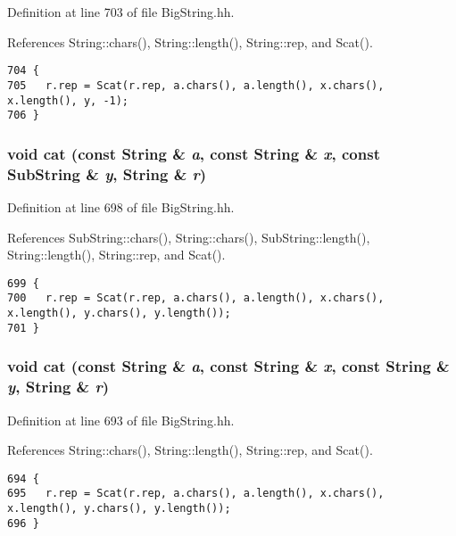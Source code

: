 Definition at line 703 of file Big\-String.hh.

References String::chars(), String::length(), String::rep, and Scat().



\footnotesize\begin{verbatim}704 {
705   r.rep = Scat(r.rep, a.chars(), a.length(), x.chars(), x.length(), y, -1);
706 }
\end{verbatim}\normalsize 
{}
\subsubsection{\setlength{\rightskip}{0pt plus 5cm}void cat (const {\bf String} \& {\em a}, const {\bf String} \& {\em x}, const {\bf Sub\-String} \& {\em y}, {\bf String} \& {\em r})\hspace{0.3cm}{\tt  [inline]}}\label{BigString_8hh_a47}




Definition at line 698 of file Big\-String.hh.

References Sub\-String::chars(), String::chars(), Sub\-String::length(), String::length(), String::rep, and Scat().



\footnotesize\begin{verbatim}699 {
700   r.rep = Scat(r.rep, a.chars(), a.length(), x.chars(), x.length(), y.chars(), y.length());
701 }
\end{verbatim}\normalsize 
{}
\subsubsection{\setlength{\rightskip}{0pt plus 5cm}void cat (const {\bf String} \& {\em a}, const {\bf String} \& {\em x}, const {\bf String} \& {\em y}, {\bf String} \& {\em r})\hspace{0.3cm}{\tt  [inline]}}\label{BigString_8hh_a46}




Definition at line 693 of file Big\-String.hh.

References String::chars(), String::length(), String::rep, and Scat().



\footnotesize\begin{verbatim}694 {
695   r.rep = Scat(r.rep, a.chars(), a.length(), x.chars(), x.length(), y.chars(), y.length());
696 }
\end{verbatim}\normalsize 
{}
